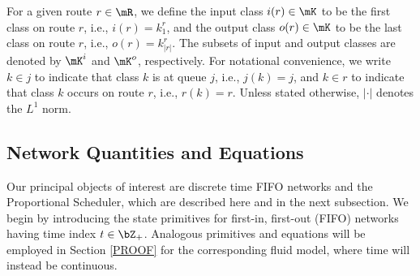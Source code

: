 \documentclass{amsart}
\newtheorem{remark}{Remark}
\begin{document}
For a given route $r\in\mR$, we define the input class $i(r)\in\mK$ to be the first class on route $r$, i.e., $i(r)=k^r_1$, and the output class $o(r)\in\mK$ to be the last class on route $r$, i.e., $o(r)=k^r_{|r|}$. The subsets of input and output classes are denoted by $\mK^i$ and  $\mK^o$, respectively.
For notational convenience, we write $k \in j$ to indicate that class $k$ is at queue $j$, i.e., $j(k)=j$, and $k\in r$ to indicate that class $k$ occurs on route $r$, i.e., $r(k)=r$. Unless stated otherwise,  $| \cdot |$ denotes the $L^1$ norm.

\iffalse
\begin{remark}\label{ScheduleRemark}
\NW{In the model defined above we assume, for concreteness, that a schedule is deterministic. However, we note that a straight-forward extension would allow random service. Such a setting would be of interest for wireless communication networks, where packets transmitted by the sender may fail to transmit due to interference. Here each schedule would be a bounded random variable on $\bZ_+^{|\mJ|}$ with mean $\sigma$. We would then let the set $\mS$ index the set of mean values for these random variables. Our positive recurrence result, Theorem 1, holds as since the functional law of large numbers and thus our fluid model and fluid stability results which apply in this case.}
\end{remark}
\fi

\iffalse
If $x\in\mJ$, it denotes the amount of packets arrived at queue $x$,  in case $x\in\mR$, it gives  the amount of packets arrived at route $x$ and, finally, if $x\in\mK$, it is the amount of arrived packets of class $x$.
In general to easy the notation for the previous three cases we are going to use the indexes $j\in\mJ$, $r\in\mR$ and $k\in\mK$, having $A_j(t)$,  $A_r(t)$ and $A_k(t)$, respectively.
\fi

\subsection{Network Quantities and Equations}\label{FIFOeq}

Our principal objects of interest are discrete time FIFO networks and the
Proportional Scheduler, which are described here and in the next subsection.  We begin by introducing the state primitives for first-in, first-out (FIFO) networks having time index $t\in\bZ_+$.  Analogous primitives and equations will be employed in Section
\ref{PROOF} for the corresponding fluid model, where time will instead be continuous.  
\end{document}
